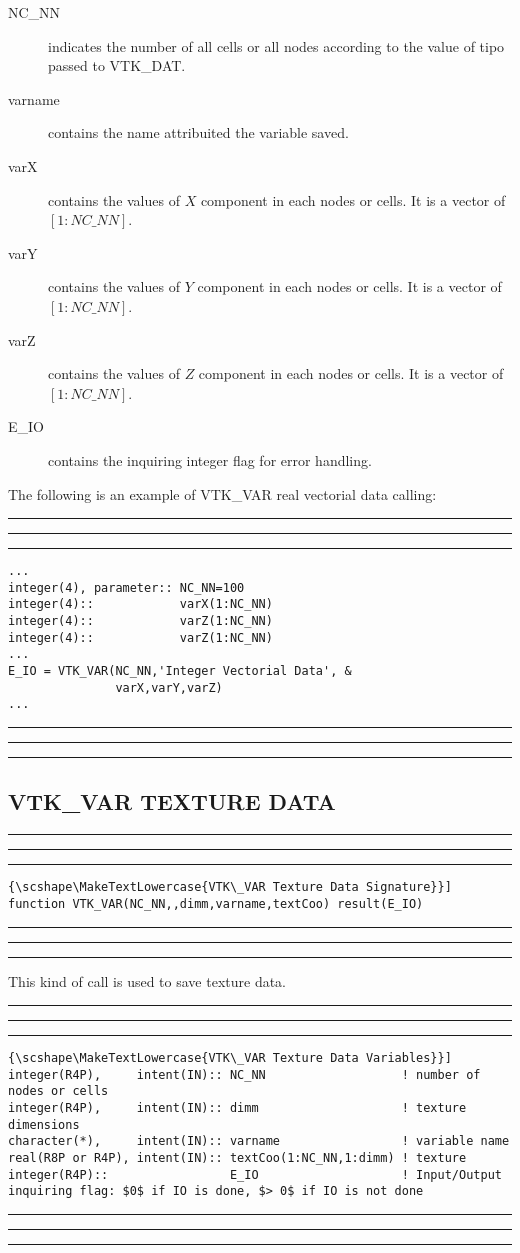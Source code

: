 \documentclass[pagesize=pdftex,fontsize=10pt,paper=a4,oneside]{scrbook}
\DeclareRobustCommand{\MarginNote}[1]{\marginpar{%
\slshape\footnotesize%
\parindent=0pt\lineskip=0pt\lineskiplimit=0pt%
\tolerance=2000\hyphenpenalty=300\exhyphenpenalty=300%
\doublehyphendemerits=100000\finalhyphendemerits=\doublehyphendemerits%
\raggedright\hspace{0pt}#1}}
\newenvironment{boxred}[1]%
               {%
                \noindent\hspace*{-0.025\textwidth}%
                \color{Maroon}%
                \rule[-5.8pt]{0.6pt}{6pt}\hspace*{-0.6pt}\rule{1.05\textwidth}{0.6pt}\hspace*{-0.6pt}\rule[-5.8pt]{0.6pt}{6pt}%
                \color{black}%
                \vspace*{0.6pt}\MarginNote{\color{Maroon}{#1}}%
               }%
               {%
                \noindent\hspace*{-0.025\textwidth}%
                \color{Maroon}%
                \rule[0pt]{0.6pt}{6pt}\hspace*{-0.6pt}\rule{1.05\textwidth}{0.6pt}\hspace*{-0.6pt}\rule[0pt]{0.6pt}{6pt}%
                \color{black}%
                \vspace*{2mm}%
               }
\DeclareRobustCommand{\MaiuscolettoBS}[1]{\textls[80]{\scshape\MakeTextLowercase{#1}}}
\begin{document}
\begin{description}
 \item[{\color{RoyalBlue}NC\_NN}] indicates the number of all cells or all nodes according to the value of
                                  {\color{RoyalBlue}tipo} passed to VTK\_DAT.
 \item[{\color{RoyalBlue}varname}] contains the name attribuited the variable saved.
 \item[{\color{RoyalBlue}varX}] contains the values of $X$ component in each nodes or cells. It is a vector of $[1:NC\_NN]$.
 \item[{\color{RoyalBlue}varY}] contains the values of $Y$ component in each nodes or cells. It is a vector of $[1:NC\_NN]$.
 \item[{\color{RoyalBlue}varZ}] contains the values of $Z$ component in each nodes or cells. It is a vector of $[1:NC\_NN]$.
 \item[{\color{RoyalBlue}E\_IO}] contains the inquiring integer flag for error handling.
\end{description}

The following is an example of VTK\_VAR real vectorial data calling:

\begin{boxred}{VTK\_VAR Integer Vectorial Data Calling}
\begin{verbatim}
...
integer(4), parameter:: NC_NN=100
integer(4)::            varX(1:NC_NN)
integer(4)::            varZ(1:NC_NN)
integer(4)::            varZ(1:NC_NN)
...
E_IO = VTK_VAR(NC_NN,'Integer Vectorial Data', &
               varX,varY,varZ)
...
\end{verbatim}
\end{boxred}

\subsection{VTK\_VAR TEXTURE DATA}

\begin{boxred}{}
\begin{lstlisting}[style=signature,title=\color{Maroon}\MaiuscolettoBS{VTK\_VAR Texture Data Signature}]
function VTK_VAR(NC_NN,,dimm,varname,textCoo) result(E_IO)
\end{lstlisting}
\end{boxred}

This kind of call is used to save texture data.

\begin{boxred}{}
\begin{lstlisting}[style=variables,title=\color{Maroon}\MaiuscolettoBS{VTK\_VAR Texture Data Variables}]
integer(R4P),     intent(IN):: NC_NN                   ! number of nodes or cells
integer(R4P),     intent(IN):: dimm                    ! texture dimensions
character(*),     intent(IN):: varname                 ! variable name
real(R8P or R4P), intent(IN):: textCoo(1:NC_NN,1:dimm) ! texture
integer(R4P)::                 E_IO                    ! Input/Output inquiring flag: $0$ if IO is done, $> 0$ if IO is not done
\end{lstlisting}
\end{boxred}
\end{document}
